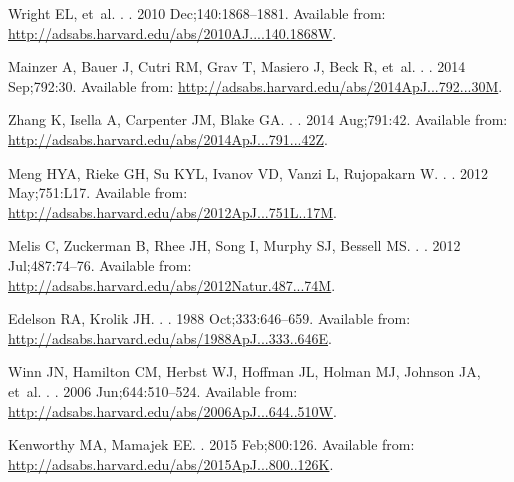 \documentclass[]{rsos}
\begin{document}
\begin{thebibliography}{10}
{Wright} EL, et~al.
.
\newblock \aj. 2010 Dec;140:1868--1881.
\newblock Available from:
  \url{http://adsabs.harvard.edu/abs/2010AJ....140.1868W}.

{Mainzer} A, {Bauer} J, {Cutri} RM, {Grav} T, {Masiero} J, {Beck} R, et~al.
.
\newblock \apj. 2014 Sep;792:30.
\newblock Available from:
  \url{http://adsabs.harvard.edu/abs/2014ApJ...792...30M}.

{Zhang} K, {Isella} A, {Carpenter} JM, {Blake} GA.
.
\newblock \apj. 2014 Aug;791:42.
\newblock Available from:
  \url{http://adsabs.harvard.edu/abs/2014ApJ...791...42Z}.

{Meng} HYA, {Rieke} GH, {Su} KYL, {Ivanov} VD, {Vanzi} L, {Rujopakarn} W.
.
\newblock \apjl. 2012 May;751:L17.
\newblock Available from:
  \url{http://adsabs.harvard.edu/abs/2012ApJ...751L..17M}.

{Melis} C, {Zuckerman} B, {Rhee} JH, {Song} I, {Murphy} SJ, {Bessell} MS.
.
\newblock \nat. 2012 Jul;487:74--76.
\newblock Available from:
  \url{http://adsabs.harvard.edu/abs/2012Natur.487...74M}.

{Edelson} RA, {Krolik} JH.
.
\newblock \apj. 1988 Oct;333:646--659.
\newblock Available from:
  \url{http://adsabs.harvard.edu/abs/1988ApJ...333..646E}.

{Winn} JN, {Hamilton} CM, {Herbst} WJ, {Hoffman} JL, {Holman} MJ, {Johnson} JA,
  et~al.
.
\newblock \apj. 2006 Jun;644:510--524.
\newblock Available from:
  \url{http://adsabs.harvard.edu/abs/2006ApJ...644..510W}.

{Kenworthy} MA, {Mamajek} EE.
\newblock \apj. 2015 Feb;800:126.
\newblock Available from:
  \url{http://adsabs.harvard.edu/abs/2015ApJ...800..126K}.


\end{thebibliography}
\end{document}
